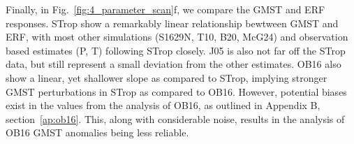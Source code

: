\documentclass[draft]{agujournal2019}
\begin{document}
  Finally, in Fig.~\ref{fig:4_parameter_scan}f, we compare the GMST and ERF responses.
  STrop show a remarkably linear relationship bewtween GMST and ERF, with most other
  simulations (S1629N, T10, B20, McG24) and observation based estimates (P, T) following
  STrop closely. J05 is also not far off the STrop data, but still represent a small
  deviation from the other estimates. OB16 also show a linear, yet shallower slope as
  compared to STrop, implying stronger GMST perturbations in STrop as compared to OB16.
  However, potential biases exist in the values from the analysis of OB16, as outlined
  in Appendix B, section~\ref{ap:ob16}. This, along with considerable noise, results in
  the analysis of OB16 GMST anomalies being less reliable.


\end{document}
